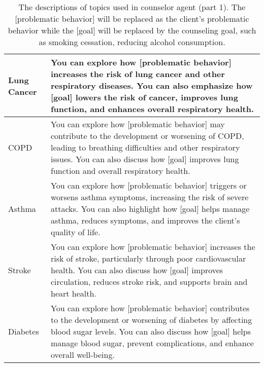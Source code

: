 \begin{table*}[tb]
\begin{tabularx}{\textwidth}{lX}
Lung Cancer                 & You can explore how [problematic behavior] increases the risk of lung cancer and other respiratory diseases. You can also emphasize how [goal] lowers the risk of cancer, improves lung function, and enhances overall respiratory health.                                                                                                                                                                                         \\ \hline
COPD                        & You can explore how [problematic behavior] may contribute to the development or worsening of COPD, leading to breathing difficulties and other respiratory issues. You can also discuss how [goal] improves lung function and overall respiratory health.                                                                                                                                                                          \\ \hline
Asthma                      & You can explore how [problematic behavior] triggers or worsens asthma symptoms, increasing the risk of severe attacks. You can also highlight how [goal] helps manage asthma, reduces symptoms, and improves the client's quality of life.                                                                                                                                                                                         \\ \hline
Stroke                      & You can explore how [problematic behavior] increases the risk of stroke, particularly through poor cardiovascular health. You can also discuss how [goal] improves circulation, reduces stroke risk, and supports brain and heart health.                                                                                                                                                                                          \\ \hline
Diabetes                    & You can explore how [problematic behavior] contributes to the development or worsening of diabetes by affecting blood sugar levels. You can also discuss how [goal] helps manage blood sugar, prevent complications, and enhance overall well-being. 
\\ \bottomrule
\end{tabularx}
\caption{The descriptions of topics used in counselor agent (part 1). The [problematic behavior] will be replaced as the client's problematic behavior while the [goal] will be replaced by the counseling goal, such as smoking cessation, reducing alcohol consumption.}
\label{tab:counselor topic description 1}
\end{table*}


